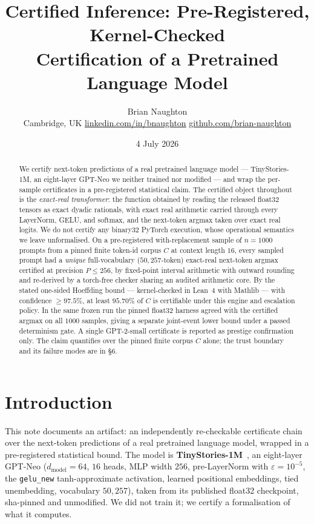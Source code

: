 \documentclass[11pt,a4paper]{article}
\title{\vspace{-1.2cm}\color{accent}\bfseries Certified Inference: Pre-Registered, Kernel-Checked\\ Certification of a Pretrained Language Model}
\author{Brian Naughton\\[2pt]
  \normalsize Cambridge, UK \;\textperiodcentered\; \href{https://www.linkedin.com/in/bnaughton/}{linkedin.com/in/bnaughton} \;\textperiodcentered\; \href{https://github.com/brian-naughton}{github.com/brian-naughton}}
\date{4 July 2026}
\begin{document}
\maketitle

\begin{abstract}
\noindent
We certify next-token predictions of a real pretrained language model --- TinyStories-1M, an eight-layer GPT-Neo we neither trained nor modified --- and wrap the per-sample certificates in a pre-registered statistical claim. The certified object throughout is the \emph{exact-real transformer}: the function obtained by reading the released float32 tensors as exact dyadic rationals, with exact real arithmetic carried through every LayerNorm, GELU, and softmax, and the next-token argmax taken over exact real logits. We do not certify any binary32 PyTorch execution, whose operational semantics we leave unformalised. On a pre-registered with-replacement sample of $n = 1000$ prompts from a pinned finite token-id corpus $C$ at context length $16$, every sampled prompt had a \emph{unique} full-vocabulary ($50{,}257$-token) exact-real next-token argmax certified at precision $P \le 256$, by fixed-point interval arithmetic with outward rounding and re-derived by a torch-free checker sharing an audited arithmetic core. By the stated one-sided Hoeffding bound --- kernel-checked in Lean~4 with Mathlib --- with confidence $\ge 97.5\%$, at least $95.70\%$ of $C$ is certifiable under this engine and escalation policy. In the same frozen run the pinned float32 harness agreed with the certified argmax on all $1000$ samples, giving a separate joint-event lower bound under a passed determinism gate. A single GPT-2-small certificate is reported as prestige confirmation only. The claim quantifies over the pinned finite corpus $C$ alone; the trust boundary and its failure modes are in \S6.
\end{abstract}

\section{Introduction}

This note documents an artifact: an independently re-checkable certificate chain over the next-token predictions of a real pretrained language model, wrapped in a pre-registered statistical bound. The model is \textbf{TinyStories-1M}~\cite{eldan2023}, an eight-layer GPT-Neo (\(d_{\text{model}}=64\), \(16\) heads, MLP width \(256\), pre-LayerNorm with \(\varepsilon = 10^{-5}\), the \texttt{gelu\_new} tanh-approximate activation, learned positional embeddings, tied unembedding, vocabulary \(50{,}257\)), taken from its published float32 checkpoint, sha-pinned and unmodified. We did not train it; we certify a formalisation of what it computes.
\end{document}

